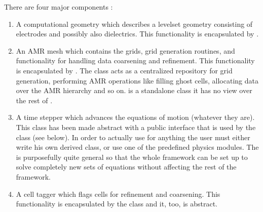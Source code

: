 \documentclass[letterpaper,10pt,english]{sphinxmanual}
\begin{document}
There are four major components :
\begin{enumerate}
%
\item {} 
A computational geometry which describes a level\sphinxhyphen{}set geometry consisting of electrodes and possibly also dielectrics.
This functionality is encapsulated by {\hyperref[\detokenize{ComputationalGeometry:chap-computational-geometry}]{}}.

\item {} 
An AMR mesh which contains the grids, grid generation routines, and functionality for handling data coarsening and refinement.
This functionality is encapsulated by {\hyperref[\detokenize{AmrMesh:chap-amr-mesh}]{}}.
The  class acts as a centralized repository for grid generation, performing AMR operations like filling ghost cells, allocating data over the AMR hierarchy and so on.
 is a standalone class \sphinxhyphen{} it has no view over the rest of .

\item {} 
A time stepper which advances the equations of motion (whatever they are).
This class has been made abstract with a public interface that is used by the  class (see below).
In order to actually use  for anything the user must either write his own derived {\hyperref[\detokenize{TimeStepper:chap-time-stepper}]{}} class, or use one of the pre\sphinxhyphen{}defined physics modules.
The  is purposefully quite general so that the whole  framework can be set up to solve completely new sets of equations without affecting the rest of the framework.

\item {} 
A cell tagger which flags cells for refinement and coarsening.
This functionality is encapsulated by the {\hyperref[\detokenize{CellTagger:chap-cell-tagger}]{}} class and it, too, is abstract.

\end{enumerate}
\end{document}
